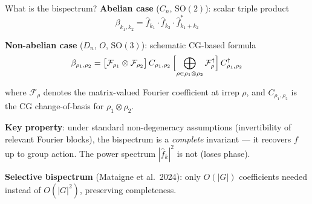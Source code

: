\documentclass[aspectratio=169]{beamer}
\newcommand{\FF}{\mathcal{F}}
\newcommand{\SO}{\mathrm{SO}}
\begin{document}
\begin{frame}{What is the bispectrum?}\small
  \textbf{Abelian case} ($C_n$, $\SO(2)$): scalar triple product
  \vspace{-4pt}
  \[
    \beta_{k_1, k_2} = \hat{f}_{k_1} \cdot \hat{f}_{k_2} \cdot \hat{f}^*_{k_1 + k_2}
  \]

  \vspace{-6pt}

  \textbf{Non-abelian case} ($D_n$, $O$, $\SO(3)$): schematic CG-based formula
  \vspace{-4pt}
  \[
    \beta_{\rho_1, \rho_2} = \bigl[\FF_{\rho_1} \otimes \FF_{\rho_2}\bigr]
    \, C_{\rho_1,\rho_2} \, \Bigl[\bigoplus_{\rho \in \rho_1 \otimes \rho_2} \FF_\rho^\dagger\Bigr] \, C_{\rho_1,\rho_2}^\dagger
  \]

  \vspace{-6pt}

  {\scriptsize where $\FF_\rho$ denotes the matrix-valued Fourier coefficient at irrep $\rho$, and $C_{\rho_1,\rho_2}$ is the CG change-of-basis for $\rho_1 \otimes \rho_2$.}

  \medskip

  \textbf{Key property}: under standard non-degeneracy assumptions (invertibility of relevant Fourier blocks), the bispectrum is a \textit{complete} invariant --- it recovers $f$ up to group action. The power spectrum $|\hat{f}_k|^2$ is not (loses phase).

  \medskip

  \textbf{Selective bispectrum} (Mataigne et al.\ 2024): only $O(|G|)$ coefficients needed instead of $O(|G|^2)$, preserving completeness.
\end{frame}
\end{document}
